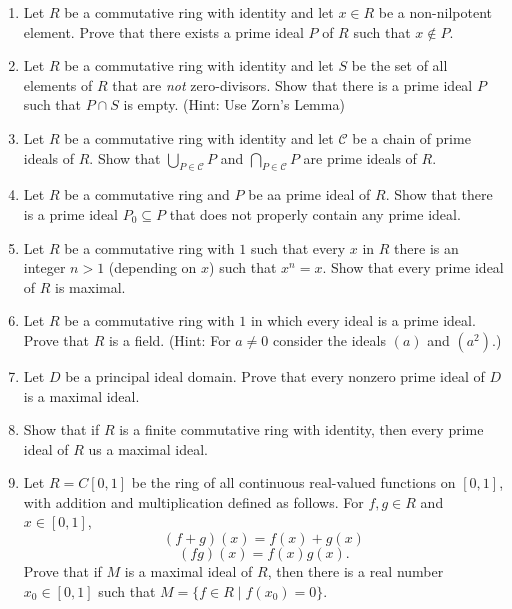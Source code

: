 \documentclass{article}
\theoremstyle{definition}
\begin{document}
\begin{enumerate}
\begin{proof}
            \end{proof}

            \item Let $R$ be a commutative ring with identity and let $x\in R$ be a non-nilpotent element. Prove that there exists a prime ideal $P$ of $R$ such that $x\notin P$.
            
            \item Let $R$ be a commutative ring with identity and let $S$ be the set of all elements of $R$ that are \textit{not} zero-divisors. Show that there is a prime ideal $P$ such that $P\cap S$ is empty. (Hint: Use Zorn's Lemma)
            
            \item Let $R$ be a commutative ring with identity and let $\mathcal{C}$ be a chain of prime ideals of $R$. Show that $\bigcup _{P\in \mathcal{C}} P$ and $\bigcap _{P\in \mathcal{C}} P$ are prime ideals of $R$.
            
            \item Let $R$ be a commutative ring and $P$ be aa prime ideal of $R$. Show that there is a prime ideal $P_0\subseteq P$ that does not properly contain any prime ideal.
            
            \item Let $R$ be a commutative ring with $1$ such that every $x$ in $R$ there is an integer $n>1$ (depending on $x$) such that $x^n=x$. Show that every prime ideal of $R$ is maximal.
            
            \item Let $R$ be a commutative ring with $1$ in which every ideal is a prime ideal. Prove that $R$ is a field. (Hint: For $a\neq 0$ consider the ideals $(a)$ and $(a^2)$.)
            
            \item Let $D$ be a principal ideal domain. Prove that every nonzero prime ideal of $D$ is a maximal ideal. 
            
            \item Show that if $R$ is a finite commutative ring with identity, then every prime ideal of $R$ us a maximal ideal.
            
            \item Let $R=C[0,1]$ be the ring of all continuous real-valued functions on $[0,1]$, with addition and multiplication defined as follows. For $f,g\in R$ and $x\in [0,1]$, \[(f+g)(x)=f(x)+g(x)\] \[(fg)(x)=f(x)g(x).\] Prove that if $M$ is a maximal ideal of $R$, then there is a real number $x_0\in [0,1]$ such that $M=\{f\in R \mid  f(x_0)=0\}$.
            

\end{enumerate}
\end{document}
